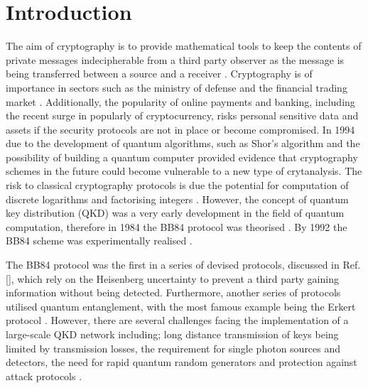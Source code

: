 \section{\label{sec:level1}Introduction} The aim of cryptography is to provide mathematical tools to keep the contents of private messages indecipherable from a third party observer as the message is being transferred between a source and a receiver \citep{ShenoyHejamadi2017QuantumBeyond}. Cryptography is of importance in sectors such as the ministry of defense and the financial trading market \citep{Diamanti2016PracticalDistribution}. Additionally, the popularity of online payments and banking, including the recent surge in popularly of cryptocurrency, risks personal sensitive data and assets if the security protocols are not in place or become compromised. In 1994 due to the development of quantum algorithms, such as Shor's algorithm and the possibility of building a quantum computer provided evidence that cryptography schemes in the future could become vulnerable to a new type of crytanalysis. The risk to classical cryptography protocols is due the potential for computation of discrete logarithms and factorising integers \citep{ShorAlgorithmsFactoring}. However, the concept of quantum key distribution (QKD) was a very early development in the field of quantum computation, therefore in 1984 the BB84 protocol was theorised \citep{unknown, Bennett2014QuantumTossing}. By 1992 the BB84 scheme was experimentally realised \citep{Bennett1992ExperimentalCryptography}.

The BB84 protocol was the first in a series of devised protocols, discussed in Ref. [], which rely on the Heisenberg uncertainty to prevent a third party gaining information without being detected. Furthermore, another series of protocols utilised quantum entanglement, with the most famous example being the Erkert protocol \citep{Singh2014QuantumReview}. However, there are several challenges facing the implementation of a large-scale QKD network including; long distance transmission of keys being limited by transmission losses, the requirement for single photon sources and detectors, the need for rapid quantum random generators and protection against attack protocols \citep{Diamanti2016PracticalDistribution,Bedington2017ProgressDistribution}.



   